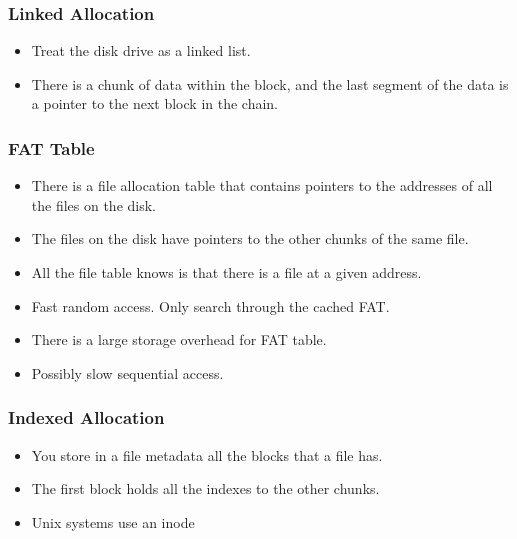 \documentclass[]{article}
\begin{document}
\subsubsection{Linked Allocation}
\begin{itemize}
\item Treat the disk drive as a linked list.
\item There is a chunk of data within the block, and the last segment of the
data is a pointer to the next block in the chain.
\end{itemize}

\subsubsection{FAT Table}
\begin{itemize}
\item There is a file allocation table that contains pointers to the addresses
of all the files on the disk.
\item The files on the disk have pointers to the other chunks of the same file.
\item All the file table knows is that there is a file at a given address.
\item Fast random access. Only search through the cached FAT.
\item There is a large storage overhead for FAT table.
\item Possibly slow sequential access.
\end{itemize}

\subsubsection{Indexed Allocation}
\begin{itemize}
\item You store in a file metadata all the blocks that a file has.
\item The first block holds all the indexes to the other chunks.
\item Unix systems use an inode
\end{itemize}
\end{document}
